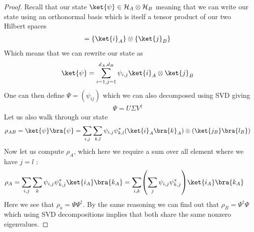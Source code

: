 \begin{proof}
    Recall that our state $\ket{\psi} \in \mathcal{H}_A \otimes \mathcal{H}_B$ meaning that we can write our state using an orthonormal basis which is itself a tensor product of our two Hilbert spaces 
	\begin{align*}  
		=\left\{\ket{i}_A\right\}  \otimes \left\{\ket{j}_B\right\}
	\end{align*}
	Which means that we can rewrite our state as 
	\begin{align*} 
		\ket{\psi} = \sum_{i= 1, j= 1}^{d_A, d_B} \psi_{i, j} \ket{i}_A \otimes \ket{j}_B
	\end{align*}
	One can then define $\Psi = \left(\psi_{ij}\right)$  which we can also  decomposed using SVD giving 
	\begin{align*} 
		\Psi = U \Sigma V^{\dagger} 
	\end{align*}
	Let us also walk through our state 
	\begin{align*} 
		\rho_{AB} = \ket{\psi}\bra{\psi} = \sum_{i, j} \sum_{k, l} \psi_{i, j}\psi_{k, l}^{\ast}\left(\ket{i}_A \bra{k}_A\right) \otimes \left(\ket{j_B}\bra{l_B}\right)
	\end{align*}
	Now let us compute $\rho_A$, which here we require a sum over all element where we have $j= l$ :
	\begin{align*} 
		\rho_A &=  \sum_{i, j} \sum_{k} \psi_{i, j}\psi_{k, j}^{\ast} \ket{i_A}\bra{k_A} = \sum_{i, k}\left(\sum_{j}\psi_{i, j}\psi_{k, j}^{\ast}\right)\ket{i_A}\bra{k_A}
	\end{align*}
	Here we see that $\rho_a = \Psi \Psi^{\dagger}$. By the same reasoning we can find out that $\rho_B = \Psi^{\dagger}\Psi$ which using SVD decompositions implies that both share the same nonzero eigenvalues.
\end{proof}

